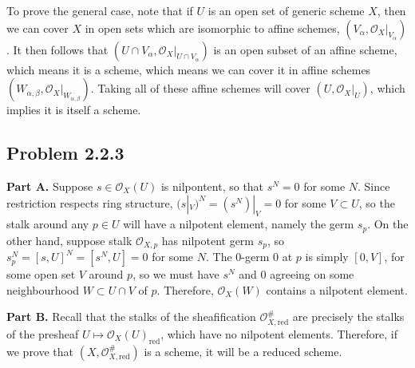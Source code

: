 \documentclass[aps,pra,showpacs,notitlepage,onecolumn,superscriptaddress,nofootinbib]{revtex4-1}
\theoremstyle{definition}
\begin{document}
  To prove the general case, note that if $U$ is an open set of generic scheme $X$, then we can cover $X$ in open sets which are isomorphic to affine schemes, $(V_{\alpha}, \mathcal{O}_X|_{V_{\alpha}})$. It then
  follows that $(U \cap V_{\alpha}, \mathcal{O}_X|_{U \cap V_{\alpha}})$ is an open subset of an affine scheme, which means it is a scheme, which means we can cover it in affine schemes $(W_{\alpha, \beta}, \mathcal{O}_X|_{W_{\alpha, \beta}})$.
  Taking all of these affine schemes will cover $(U, \mathcal{O}_X|_U)$, which implies it is itself a scheme.

\subsection{Problem 2.2.3}

\noindent \textbf{Part A.} Suppose $s \in \mathcal{O}_X(U)$ is nilpontent, so that $s^N = 0$ for some $N$. Since restriction respects ring structure, $(s|_V)^N = (s^N)|_V = 0$ for some $V \subset U$,
      so the stalk around any $p \in U$ will have a nilpotent element, namely the germ $s_p$. On the other hand, suppose stalk $\mathcal{O}_{X, p}$ has nilpotent germ $s_p$, so
      $s_p^N = [s, U]^N = [s^N, U] = 0$ for some $N$. The $0$-germ $0$ at $p$ is simply $[0, V]$, for some open set $V$ around $p$, so we must have $s^N$ and $0$ agreeing on some neighbourhood
      $W \subset U \cap V$ of $p$. Therefore, $\mathcal{O}_X(W)$ contains a nilpotent element.
      \newline

\noindent \textbf{Part B.} Recall that the stalks of the sheafification $\mathcal{O}_{X, \text{red}}^{\#}$ are precisely the stalks of the presheaf $U \mapsto \mathcal{O}_X(U)_{\text{red}}$, which have no nilpotent elements.
        Therefore, if we prove that $(X, \mathcal{O}_{X, \text{red}}^{\#})$ is a scheme, it will be a reduced scheme.
\end{document}
